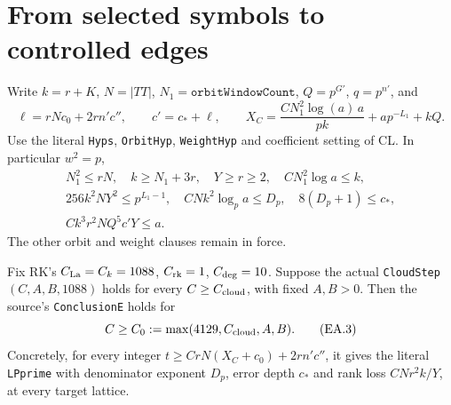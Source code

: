 \section{From selected symbols to controlled edges}\label{sec:edge-assembly}


Write $k=r+K$, $N=|TT|$, $N_1=\texttt{orbitWindowCount}$,
$Q=p^{G'}$, $q=p^{n'}$, and
\[
 \ell=rNc_0+2rn'c'',\qquad c'=c_*+\ell,\qquad
 X_C=\frac{CN_1^2\log(a)\,a}{pk}+ap^{-L_1}+kQ.
 \tag{EA.1}
\]
Use the literal \texttt{Hyps}, \texttt{OrbitHyp}, \texttt{WeightHyp} and
coefficient setting of CL. In particular $w^2=p$,
\[
\begin{gathered}
 N_1^2\le rN,\quad k\ge N_1+3r,\quad Y\ge r\ge2,
 \quad CN_1^2\log a\le k,\\
 256k^2NY^2\le p^{L_1-1},\quad CNk^2\log_p a\le D_p,
 \quad8(D_p+1)\le c_*,\\
 Ck^3r^2NQ^5c'Y\le a.
\end{gathered}\tag{EA.2}
\]
The other orbit and weight clauses remain in force.

\begin{theorem}
Fix RK's $C_{\rm La}=C_k=1088$, $C_{\rm rk}=1$, $C_{\rm deg}=10$.
Suppose the actual \texttt{CloudStep}$(C,A,B,1088)$ holds for every
$C\ge C_{\rm cloud}$, with fixed $A,B>0$. Then the source's
\texttt{ConclusionE} holds for
\[
 C\ge C_0:=\max(4129,C_{\rm cloud},A,B).
 \tag{EA.3}
\]
Concretely, for every integer
$t\ge CrN(X_C+c_0)+2rn'c''$, it gives the literal
\texttt{LPprime} with denominator exponent $D_p$, error depth $c_*$ and
rank loss $CNr^2k/Y$, at every target lattice.
\end{theorem}

